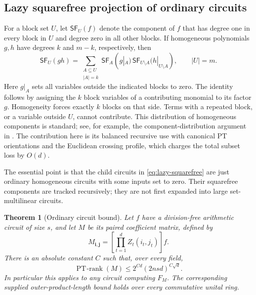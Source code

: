 \documentclass[11pt]{article}
\newtheorem{theorem}{Theorem}[section]
\theoremstyle{definition}
\theoremstyle{remark}
\newcommand{\PT}{\operatorname{PT\!\text{-}rank}}
\begin{document}
\subsection{Lazy squarefree projection of ordinary circuits}

For a block set $U$, let $\mathsf{SF}_U(f)$ denote the component of
$f$ that has degree one in every block in $U$ and degree zero in
all other blocks.  If homogeneous polynomials $g,h$ have degrees
$k$ and $m-k$, respectively, then
\begin{equation}
\label{eq:lazy-squarefree}
 \mathsf{SF}_U(gh)
 =\sum_{\substack{A\subseteq U\\|A|=k}}
       \mathsf{SF}_A(g|_A)\,
       \mathsf{SF}_{U\setminus A}(h|_{U\setminus A}),
 \qquad |U|=m.
\end{equation}
Here $g|_A$ sets all variables outside the indicated blocks to zero.
The identity follows by assigning the $k$ block variables of a
contributing monomial to its factor $g$.  Homogeneity forces exactly
$k$ blocks on that side.  Terms with a repeated block, or a variable
outside $U$, cannot contribute.  This distribution of homogeneous
components is standard; see, for example, the component-distribution
argument in \cite[Lemma~9]{brandkaskiwang}.  The contribution here is
its balanced recursive use with canonical PT orientations and the
Euclidean crossing profile, which charges the total subset loss by
$O(d)$.

The essential point is that the child circuits in
\eqref{eq:lazy-squarefree} are just ordinary homogeneous circuits
with some inputs set to zero.  Their squarefree components are
tracked recursively; they are not first expanded into large
set-multilinear circuits.

\begin{theorem}[Ordinary circuit bound]
\label{thm:ordinary-circuit}
Let $f$ have a division-free arithmetic circuit of size $s$, and let
$M$ be its paired coefficient matrix, defined by
\[
 M_{\mathbf i,\mathbf j}
 =\left[\prod_{t=1}^d Z_t(i_t,j_t)\right]f.
\]
There is an absolute constant $C$ such that, over every field,
\begin{equation}
\label{eq:ordinary-circuit}
 \PT(M)\le 2^{Cd}(2nsd)^{C\sqrt d}.
\end{equation}
In particular this applies to any circuit computing $F_M$.
The corresponding supplied outer-product-length bound holds over
every commutative unital ring.
\end{theorem}
\end{document}
